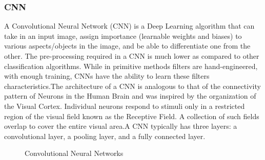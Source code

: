         \subsubsection{CNN}
            A Convolutional Neural Network (CNN) is a Deep Learning algorithm
            that can take in an input image, assign importance (learnable weights and biases) to various aspects/objects in the image, and be able to differentiate one from the other. The pre-processing required in a CNN is much lower as compared to other classification algorithms. While in primitive methods filters are hand-engineered, with enough training, CNNs have the ability to learn these filters characteristics.The architecture of a CNN is analogous to that of the connectivity pattern of Neurons in the Human Brain and was inspired by the organization of the Visual Cortex. Individual neurons respond to stimuli only in a restricted region of the visual field known as the Receptive Field. A collection of such fields overlap to cover the entire visual area.A CNN typically has three layers: a convolutional layer, a pooling layer, and a fully connected layer.

        \begin{figure}[hbt!]
                \caption{Convolutional Neural Networks}
        \end{figure}

        \newpage

